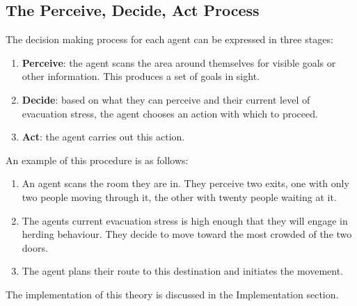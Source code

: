 \subsection{The Perceive, Decide, Act Process}
The decision making process for each agent can be expressed in three stages:
\begin{enumerate}
  \item{\textbf{Perceive}: the agent scans the area around themselves for visible goals or other information. This produces a set of goals in sight.}
  \item{\textbf{Decide}: based on what they can perceive and their current level of evacuation stress, the agent chooses an action with which to proceed.}
  \item{\textbf{Act}: the agent carries out this action.}
\end{enumerate}
An example of this procedure is as follows:
\begin{enumerate}
  \item{An agent scans the room they are in. They perceive two exits, one with only two people moving through it, the other with twenty people waiting at it.}
  \item{The agents current evacuation stress is high enough that they will engage in herding behaviour. They decide to move toward the most crowded of the two doors.}
  \item{The agent plans their route to this destination and initiates the movement.}
\end{enumerate}
 The implementation of this theory is discussed in the Implementation section.

%
%
%

